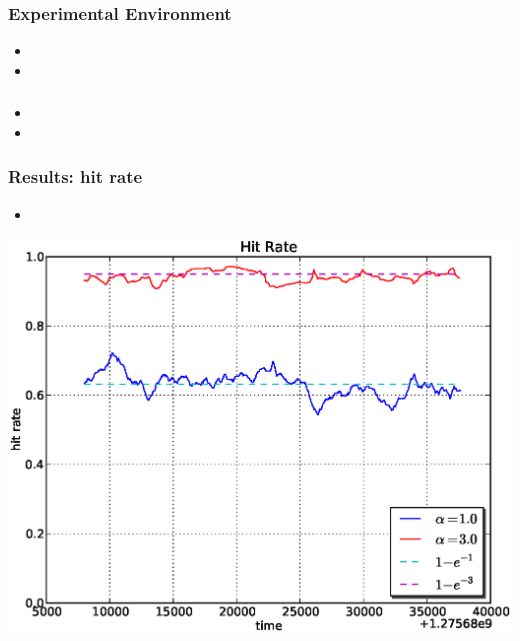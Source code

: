 \documentclass[red]{beamer}
\begin{document}
\begin{frame}
\frametitle{Experimental Environment}
\begin{itemize}
\item 
\item 
\end{itemize}
\end{frame}

\begin{frame}
\frametitle{}
\begin{itemize}
\item 
\item 
\end{itemize}
\end{frame}


\begin{frame}
\frametitle{Results: hit rate}
\begin{itemize}
\item 
\end{itemize}
\begin{center}
\includegraphics[scale=0.4]{figs/plab_hit.eps}
\end{center}
\end{frame}
\end{document}
